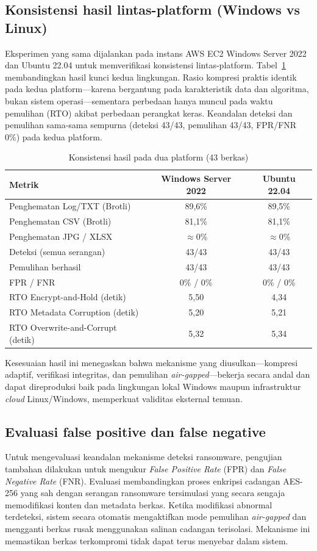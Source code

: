 \documentclass{iaesarticle}
\begin{document}
\subsection{Konsistensi hasil lintas-platform (Windows vs Linux)}
Eksperimen yang sama dijalankan pada instans AWS EC2 Windows Server 2022 dan Ubuntu 22.04 untuk memverifikasi konsistensi lintas-platform. Tabel~\ref{tab:cross_platform} membandingkan hasil kunci kedua lingkungan. Rasio kompresi praktis identik pada kedua platform---karena bergantung pada karakteristik data dan algoritma, bukan sistem operasi---sementara perbedaan hanya muncul pada waktu pemulihan (RTO) akibat perbedaan perangkat keras. Keandalan deteksi dan pemulihan sama-sama sempurna (deteksi 43/43, pemulihan 43/43, FPR/FNR 0\%) pada kedua platform.

\begin{table}[H]
\centering
\fontsize{8pt}{10pt}\selectfont
\caption{Konsistensi hasil pada dua platform (43 berkas)}
\label{tab:cross_platform}
\begin{tabular}{l c c}
\hline
\textbf{Metrik} & \textbf{Windows Server 2022} & \textbf{Ubuntu 22.04} \\
\hline
Penghematan Log/TXT (Brotli) & 89,6\% & 89,5\% \\
Penghematan CSV (Brotli)     & 81,1\% & 81,1\% \\
Penghematan JPG / XLSX       & $\approx$0\% & $\approx$0\% \\
Deteksi (semua serangan)     & 43/43 & 43/43 \\
Pemulihan berhasil           & 43/43 & 43/43 \\
FPR / FNR                    & 0\% / 0\% & 0\% / 0\% \\
RTO Encrypt-and-Hold (detik) & 5,50 & 4,34 \\
RTO Metadata Corruption (detik) & 5,20 & 5,21 \\
RTO Overwrite-and-Corrupt (detik) & 5,32 & 5,34 \\
\hline
\end{tabular}
\end{table}

Kesesuaian hasil ini menegaskan bahwa mekanisme yang diusulkan---kompresi adaptif, verifikasi integritas, dan pemulihan \textit{air-gapped}---bekerja secara andal dan dapat direproduksi baik pada lingkungan lokal Windows maupun infrastruktur \textit{cloud} Linux/Windows, memperkuat validitas eksternal temuan.

\subsection{Evaluasi false positive dan false negative}
Untuk mengevaluasi keandalan mekanisme deteksi ransomware, pengujian tambahan dilakukan untuk mengukur \textit{False Positive Rate} (FPR) dan \textit{False Negative Rate} (FNR). Evaluasi membandingkan proses enkripsi cadangan AES-256 yang sah dengan serangan ransomware tersimulasi yang secara sengaja memodifikasi konten dan metadata berkas. Ketika modifikasi abnormal terdeteksi, sistem secara otomatis mengaktifkan mode pemulihan \textit{air-gapped} dan mengganti berkas rusak menggunakan salinan cadangan terisolasi. Mekanisme ini memastikan berkas terkompromi tidak dapat terus menyebar dalam sistem.
\end{document}
